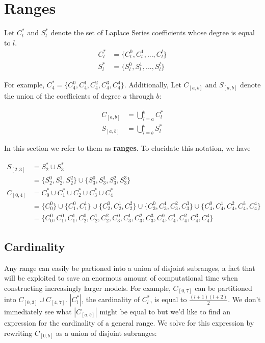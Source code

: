\documentclass[a4paper]{article}
\theoremstyle{definition}
\begin{document}
\section{Ranges}\label{ranges}

Let $C_l^*$ and $S_l^*$ denote the set of Laplace Series coefficients whose degree is equal to $l$.
\begin{align*}
   C_l^* &= \{C_l^0, C_l^1, ..., C_l^l\} \\
   S_l^* &= \{S_l^0, S_l^1, ..., S_l^l\} 
\end{align*}

For example, $C_4^* =\{C_4^0, C_4^1, C_4^2, C_4^3, C_4^4\}$. Additionally, Let 
$C_{[a, b]}$ and $S_{[a, b]}$ denote the union of the coefficients of degree $a$ through $b$:

\begin{align*}
    C_{[a, b]} &= \bigcup_{l = a}^{b} C_l^* \\
    S_{[a, b]} &= \bigcup_{l = b}^{b} S_l^*
\end{align*}

In this section we refer to them as \textbf{ranges}. To elucidate this notation, we have

\begin{align*}
    S_{[2, 3]} &= S_2^* \cup S_3^* \\
               &= \{S_2^0, S_2^1, S_2^2\} \cup \{S_3^0, S_3^1, S_3^2, S_3^3\} \\
    C_{[0, 4]} &= C_0^* \cup C_1^* \cup C_2^* \cup C_3^* \cup C_4^* \\
               &= \{C_0^0\} \cup \{C_1^0, C_1^1\} \cup \{C_2^0, C_2^1, C_2^2\} \cup \{C_3^0, C_3^1, C_3^2, C_3^3\} \cup \{C_4^0, C_4^1, C_4^2, C_4^3, C_4^4\} \\
               &= \{C_0^0, C_1^0, C_1^1, C_2^0, C_2^1, C_2^2, C_3^0, C_3^1, C_3^2, C_3^3, C_4^0, C_4^1, C_4^2, C_4^3, C_4^4\} 
\end{align*}

\subsection{Cardinality}

Any range can easily be partioned into a union of disjoint subranges, a fact that will be exploited to save an enormous amount of computational time when constructing
increasingly larger models. For example, $C_{[0, 7]}$ can be partitioned into $C_{[0, 3]} \cup C_{[4, 7]}$. $|C_l^*|$, the cardinality of $C_l^*$, is equal to 
$\frac{(l + 1)(l + 2)}{2}$. We don't immediately see what $|C_{[a, b]}|$ might be equal to but we'd like to find an expression for the cardinality of a general range.
We solve for this expression by rewriting $C_{[0, b]}$ as a union of disjoint subranges:
\end{document}
